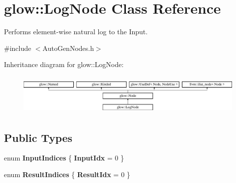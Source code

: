 \hypertarget{classglow_1_1_log_node}{}\section{glow\+:\+:Log\+Node Class Reference}
\label{classglow_1_1_log_node}


Performs element-\/wise natural log to the Input.  




{\ttfamily \#include $<$Auto\+Gen\+Nodes.\+h$>$}

Inheritance diagram for glow\+:\+:Log\+Node\+:\begin{figure}[H]
\begin{center}
\leavevmode
\includegraphics[height=2.028986cm]{classglow_1_1_log_node}
\end{center}
\end{figure}
\subsection*{Public Types}
\begin{DoxyCompactItemize}
\item 
\mbox{\label{classglow_1_1_log_node_a99cadfa8d0f851b03c544d324247bb0b}} 
enum {\bfseries Input\+Indices} \{ {\bfseries Input\+Idx} = 0
 \}
\item 
\mbox{\label{classglow_1_1_log_node_a6060757257db5f4468886cbcf2592e5e}} 
enum {\bfseries Result\+Indices} \{ {\bfseries Result\+Idx} = 0
 \}
\end{DoxyCompactItemize}
